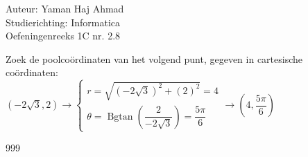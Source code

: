 \documentclass[a4paper]{article}
\begin{document}
\noindent \large Auteur: Yaman Haj Ahmad \\
\noindent \large Studierichting: Informatica\\
\noindent \large Oefeningenreeks 1C nr. 2.8\\

\medskip

\normalsize

Zoek de poolcoördinaten van het volgend punt, gegeven in cartesische coördinaten: \\

$\left(-2\sqrt{3}, 2\right) \rightarrow \left\{
    \begin{array}{l}
        r = \sqrt{(-2\sqrt{3})^2 + (2)^2} = 4\\
        \theta = \operatorname{Bgtan}\left(\dfrac{2}{-2\sqrt{3}}\right) = \dfrac{5\pi}{6}
    \end{array}
\right. \rightarrow \left(4, \dfrac{5\pi}{6}\right)$

\begin{thebibliography}{999}
\end{thebibliography}
\end{document}
